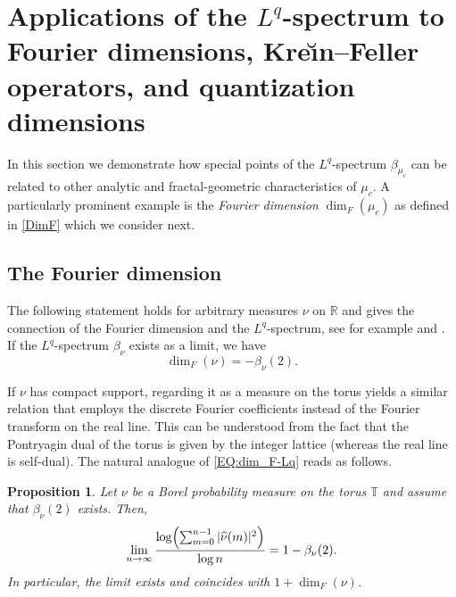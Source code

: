 \documentclass[11pt,reqno]{amsart}
\theoremstyle{plain}
\newtheorem{prop}[theorem]{Proposition}
\theoremstyle{definition}
\newcommand{\R}{{\mathbb R}}
\newcommand{\T}{{\mathbb T}}
\begin{document}
\section{Applications of the $L^q$-spectrum to Fourier dimensions, Kre\u{\i}n--Feller operators, and quantization dimensions}\label{sec: KreinFeller}
In this section we demonstrate how special points of the $L^q$-spectrum $\beta_{\mu_{c}}$   can be related to other analytic and fractal-geometric characteristics of $\mu_{c}$. A particularly prominent example is the \emph{Fourier dimension}  $\dim_{F}(\mu_c)$  as defined in \eqref{DimF} which we consider next.

\subsection{The Fourier dimension}
\label{SEC:Fourier-dimension}

The following statement holds for arbitrary measures  $\nu$ on $\R$ and gives the connection of the Fourier dimension and the $L^{q}$-spectrum, see for example \cite{Lau92} and \cite[Thm.~6.6]{Strichartz}. If the $L^q$-spectrum $\beta_\nu$ exists as a limit, we have 
\begin{equation}
\label{EQ:dim_F-Lq}
\dim_F(\nu) = - \beta_\nu(2).
\end{equation}

If $\nu$ has compact support, regarding it as a measure on the torus yields a similar relation that employs the discrete Fourier coefficients instead of the Fourier transform on the real line. This can be understood from the fact that the Pontryagin dual of the torus is given by the integer lattice (whereas the real line is self-dual). The natural analogue of \eqref{EQ:dim_F-Lq} reads as follows.

\begin{prop}
\label{PROP:FD-characterisation}
Let $\nu$ be a Borel probability measure on the torus $\T$ and assume that $\beta_{\nu}(2)$ exists. Then,
\begin{equation}
\label{EQ:dim-F-analogue}
\lim_{n \to \infty} \frac{\log\Bigl(\sum_{m=0}^{n-1} |\widehat{\nu}(m)|^2 \Bigr)}{\log n} = 1 - \beta_{\nu}(2).
\end{equation}
In particular, the limit exists and coincides with $1+\dim_F(\nu)$.
\end{prop}
\end{document}
